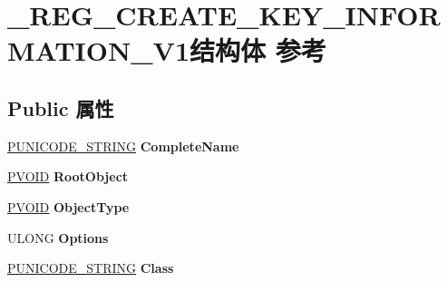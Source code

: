 \hypertarget{struct___r_e_g___c_r_e_a_t_e___k_e_y___i_n_f_o_r_m_a_t_i_o_n___v1}{}\section{\+\_\+\+R\+E\+G\+\_\+\+C\+R\+E\+A\+T\+E\+\_\+\+K\+E\+Y\+\_\+\+I\+N\+F\+O\+R\+M\+A\+T\+I\+O\+N\+\_\+\+V1结构体 参考}
\label{struct___r_e_g___c_r_e_a_t_e___k_e_y___i_n_f_o_r_m_a_t_i_o_n___v1}
\subsection*{Public 属性}
\begin{DoxyCompactItemize}
\item 
\mbox{\label{struct___r_e_g___c_r_e_a_t_e___k_e_y___i_n_f_o_r_m_a_t_i_o_n___v1_a4960c7b6491ed71cc36668c6a566d9fb}} 
\hyperlink{struct___u_n_i_c_o_d_e___s_t_r_i_n_g}{P\+U\+N\+I\+C\+O\+D\+E\+\_\+\+S\+T\+R\+I\+NG} {\bfseries Complete\+Name}
\item 
\mbox{\label{struct___r_e_g___c_r_e_a_t_e___k_e_y___i_n_f_o_r_m_a_t_i_o_n___v1_a0b2068926f90d99f9b27e9baa586797c}} 
\hyperlink{interfacevoid}{P\+V\+O\+ID} {\bfseries Root\+Object}
\item 
\mbox{\label{struct___r_e_g___c_r_e_a_t_e___k_e_y___i_n_f_o_r_m_a_t_i_o_n___v1_a277f2725185923ec157c4b75e3bb2f7c}} 
\hyperlink{interfacevoid}{P\+V\+O\+ID} {\bfseries Object\+Type}
\item 
\mbox{\label{struct___r_e_g___c_r_e_a_t_e___k_e_y___i_n_f_o_r_m_a_t_i_o_n___v1_a5913cba20223f7d4525aff6366523597}} 
U\+L\+O\+NG {\bfseries Options}
\item 
\mbox{\label{struct___r_e_g___c_r_e_a_t_e___k_e_y___i_n_f_o_r_m_a_t_i_o_n___v1_a6163b74773f07cb504e75924a52b95d5}} 
\hyperlink{struct___u_n_i_c_o_d_e___s_t_r_i_n_g}{P\+U\+N\+I\+C\+O\+D\+E\+\_\+\+S\+T\+R\+I\+NG} {\bfseries Class}

\end{DoxyCompactItemize}
